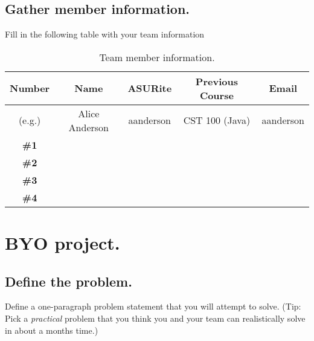 \documentclass[12pt]{article}
\begin{document}
\subsection{Gather member information.}
Fill in the following table with your team information
\begin{table}[htdp]
\caption{Team member information.}
\begin{center}
\begin{tabular}{c c c c c}
\hline\hline
Number & Name & ASURite & Previous Course & Email \\ [.5ex]
\hline
(e.g.) & Alice Anderson & aanderson & CST 100 (Java) & aanderson \\
\hline
{\bf \#1} & & & & \\ [1ex]
{\bf \#2} & & & & \\ [1ex]
{\bf \#3} & & & & \\ [1ex]
{\bf \#4} & & & & \\ [1ex]
\hline
\end{tabular}
\end{center}
\label{table:team}
\end{table}

\pagebreak

\section{BYO project.}

\subsection{Define the problem.}

Define a one-paragraph problem statement that you will attempt to solve. (Tip: Pick a {\it practical} problem that you think you and your team can realistically solve in about a months time.)


\underline{\phantom{\hspace{5in}}}

\underline{\phantom{\hspace{5in}}}

\underline{\phantom{\hspace{5in}}}

\underline{\phantom{\hspace{5in}}}

\underline{\phantom{\hspace{5in}}}

\underline{\phantom{\hspace{5in}}}
\end{document}
